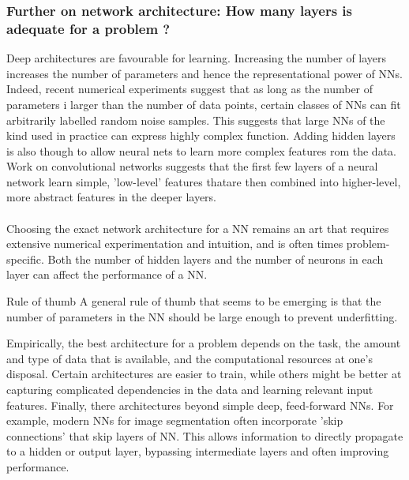 \subsubsection{Further on network architecture: How many layers is adequate for a problem ?}
\label{subsubsec:deepBestPracticeArchitecture}
Deep architectures are favourable for learning. Increasing the number of layers increases the number of parameters and hence the representational power of NNs. Indeed, recent numerical experiments suggest that as long as the number of parameters i larger than the number of data points, certain classes of NNs can fit arbitrarily labelled random noise samples. This suggests that large NNs of the kind used in practice can express highly complex function. Adding hidden layers is also though to allow neural nets to learn more complex features rom the data. Work on convolutional networks suggests that the first few layers of a neural network learn simple, ’low-level’ features thatare then combined into higher-level, more abstract features in the deeper layers.\\
\\
Choosing the exact network architecture for a NN remains an art that requires extensive numerical experimentation and intuition, and is often times problem-specific. Both the number of hidden layers and the number of neurons in each layer can affect the performance of a NN.
\begin{mybox}{Rule of thumb}
	A general rule of thumb that seems to be emerging is that the number of parameters in the NN should be large enough to prevent underfitting.
\end{mybox}
Empirically, the best architecture for a problem depends on the task, the amount and type of data that is available, and the computational resources at one's disposal. Certain architectures are easier to train, while others might be better at capturing complicated dependencies in the data and learning relevant input features. Finally, there architectures beyond simple deep, feed-forward NNs.
For example, modern NNs for image segmentation often incorporate ’skip connections’ that skip layers of NN. This allows information to directly propagate to a hidden or output layer, bypassing intermediate layers and often improving performance.

